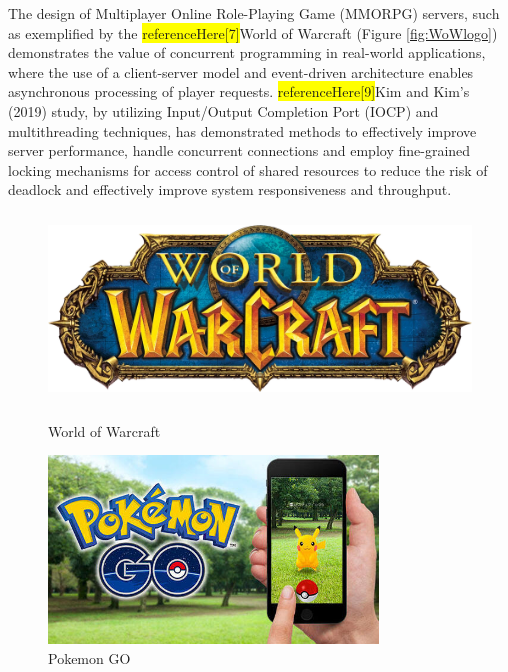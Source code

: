 \documentclass{l4proj}
\begin{document}
The design of Multiplayer Online Role-Playing Game (MMORPG) servers, such as exemplified by the \colorbox{yellow}{referenceHere[7]}World of Warcraft (Figure \ref{fig:WoWlogo}) demonstrates the value of concurrent programming in real-world applications, where the use of a client-server model and event-driven architecture enables asynchronous processing of player requests. \colorbox{yellow}{referenceHere[9]}Kim and Kim's (2019) study, by utilizing Input/Output Completion Port (IOCP) and multithreading techniques, has demonstrated methods to effectively improve server performance, handle concurrent connections and employ fine-grained locking mechanisms for access control of shared resources to reduce the risk of deadlock and effectively improve system responsiveness and throughput.

\begin{figure}[h]
    \centering
    \begin{minipage}[t]{0.35\textwidth}
        \centering
        \includegraphics[width=\linewidth,height=5cm,keepaspectratio]{images/WoWlogo.png}
        \caption{World of Warcraft}
        \label{fig:WoWlogo}
    \end{minipage}
    \quad
    \begin{minipage}[t]{0.30\textwidth}
        \centering
        \includegraphics[width=\linewidth,height=5cm,keepaspectratio]{images/PokemonGo.jpeg}
        \caption{Pokemon GO}
        \label{fig:PokemonGo}
    \end{minipage}
\end{figure}
\end{document}
